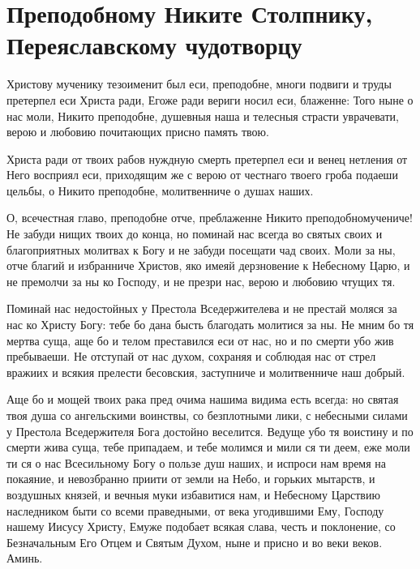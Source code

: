 \section{Преподобному Никите Столпнику, Переяславскому чудотворцу}\begin{mymulticols}


Христову мученику тезоименит был еси, преподобне, многи подвиги и труды претерпел еси Христа ради, Егоже ради вериги носил еси, блаженне: Того ныне о нас моли, Никито преподобне, душевныя наша и телесныя страсти уврачевати, верою и любовию почитающих присно память твою.


Христа ради от твоих рабов нуждную смерть претерпел еси и венец нетления от Него восприял еси, приходящим же с верою от честнаго твоего гроба подаеши цельбы, о Никито преподобне, молитвенниче о душах наших.


\ifpdf
  \begin{small}
\else
\fi

О, всечестная главо, преподобне отче, преблаженне Никито преподобномучениче! Не забуди нищих твоих до конца, но поминай нас всегда во святых своих и благоприятных молитвах к Богу и не забуди посещати чад своих. Моли за ны, отче благий и избранниче Христов, яко имеяй дерзновение к Небесному Царю, и не премолчи за ны ко Господу, и не презри нас, верою и любовию чтущих тя. 

Поминай нас недостойных у Престола Вседержителева и не престай моляся за нас ко Христу Богу: тебе бо дана бысть благодать молитися за ны. Не мним бо тя мертва суща, аще бо и телом преставился еси от нас, но и по смерти убо жив пребываеши. Не отступай от нас духом, сохраняя и соблюдая нас от стрел вражиих и всякия прелести бесовския, заступниче и молитвенниче наш добрый. 

Аще бо и мощей твоих рака пред очима нашима видима есть всегда: но святая твоя душа со ангельскими воинствы, со безплотными лики, с небесными силами у Престола Вседержителя Бога достойно веселится. Ведуще убо тя воистину и по смерти жива суща, тебе припадаем, и тебе молимся и мили ся ти деем, еже моли ти ся о нас Всесильному Богу о пользе душ наших, и испроси нам время на покаяние, и невозбранно приити от земли на Небо, и горьких мытарств, и воздушных князей, и вечныя муки избавитися нам, и Небесному Царствию наследником быти со всеми праведными, от века угодившими Ему, Господу нашему Иисусу Христу, Емуже подобает всякая слава, честь и поклонение, со Безначальным Его Отцем и Святым Духом, ныне и присно и во веки веков. Аминь.
\ifpdf
  \end{small}
\else
\fi


\end{mymulticols}

